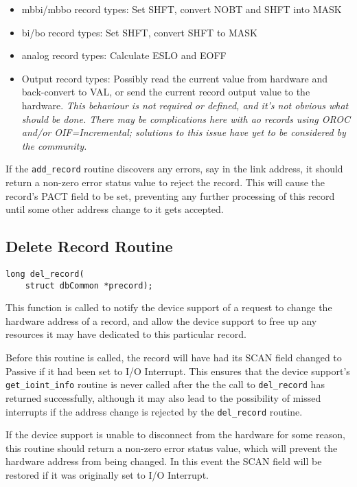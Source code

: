 \begin{itemize}
\item mbbi/mbbo record types: Set SHFT, convert NOBT and SHFT into MASK

\item bi/bo record types: Set SHFT, convert SHFT to MASK

\item analog record types: Calculate ESLO and EOFF

\item Output record types: Possibly read the current value from hardware and back-convert to VAL, or send the current 
record output value to the hardware. \emph{This behaviour is not required or defined, and it's not obvious what should be done. There may be complications here with ao records using OROC and/or OIF=Incremental; solutions to this issue have yet to be considered by the community.}

\end{itemize}

If the \verb|add_record| routine discovers any errors, say in the link address, it should return a non-zero error status value to 
reject the record. This will cause the record's PACT field to be set, preventing any further processing of this record until 
some other address change to it gets accepted.

\subsection{Delete Record Routine}

\begin{verbatim}
long del_record(
    struct dbCommon *precord);
\end{verbatim}

This function is called to notify the device support of a request to change the hardware address of a record, and allow the 
device support to free up any resources it may have dedicated to this particular record.

Before this routine is called, the record will have had its SCAN field changed to Passive if it had been set to I/O Interrupt. 
This ensures that the device support's \verb|get_ioint_info| routine is never called after the the call to \verb|del_record| has 
returned successfully, although it may also lead to the possibility of missed interrupts if the address change is rejected by 
the \verb|del_record| routine.

If the device support is unable to disconnect from the hardware for some reason, this routine should return a non-zero 
error status value, which will prevent the hardware address from being changed. In this event the SCAN field will be 
restored if it was originally set to I/O Interrupt.

